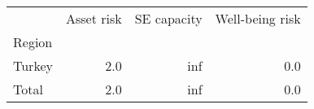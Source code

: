 \begin{tabular}{lrrr}
\toprule
{} &  Asset risk &  SE capacity &  Well-being risk \\
Region &             &              &                  \\
\midrule
Turkey &         2.0 &          inf &              0.0 \\
Total  &         2.0 &          inf &              0.0 \\
\bottomrule
\end{tabular}
